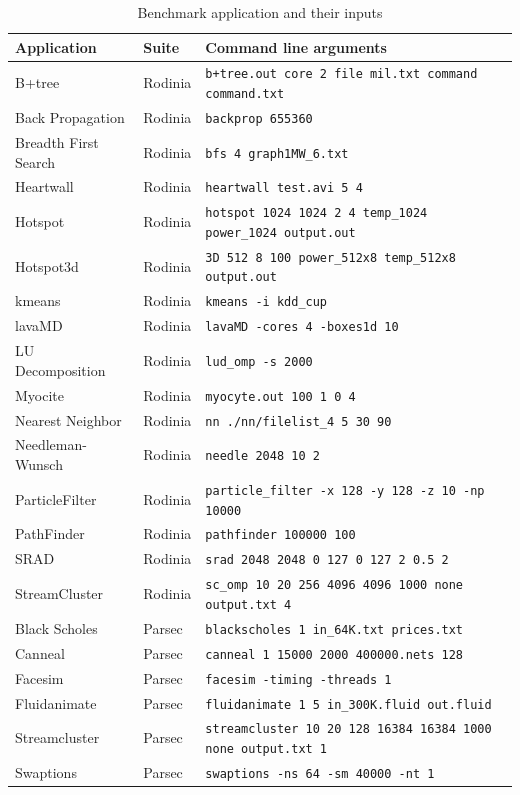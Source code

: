 \documentclass[12pt,twoside]{reedthesis}
\begin{document}
		
		\begin{table}
			\caption{Benchmark application and their inputs}
			\label{all-applications-table}
			\scriptsize
			\begin{tabular}{ |l|l|l| }
				\hline
				Application          & Suite   & Command line arguments  \\ \hline
				\hline
				B+tree & Rodinia  &  \texttt{b+tree.out core 2 file mil.txt command command.txt}  \\ \hline
				Back Propagation & Rodinia  &  \texttt{backprop 655360} \\ \hline
				Breadth First Search & Rodinia  &  \texttt{bfs 4 graph1MW\_6.txt}  \\ \hline
				Heartwall & Rodinia  & \texttt{heartwall test.avi 5 4} \\ \hline
				Hotspot & Rodinia  &   \texttt{hotspot 1024 1024 2 4 temp\_1024 power\_1024 output.out} \\ \hline
				Hotspot3d & Rodinia  & \texttt{3D 512 8 100 power\_512x8 temp\_512x8 output.out}   \\ \hline
				kmeans & Rodinia  &    \texttt{kmeans -i kdd\_cup} \\ \hline
				lavaMD & Rodinia  &  \texttt{lavaMD -cores 4 -boxes1d 10}   \\ \hline
				LU Decomposition & Rodinia    &  \texttt{lud\_omp -s 2000} \\ \hline
				Myocite & Rodinia  &  \texttt{myocyte.out 100 1 0 4}  \\ \hline
				Nearest Neighbor & Rodinia  &  \texttt{nn ./nn/filelist\_4 5 30 90}   \\ \hline
				Needleman-Wunsch & Rodinia  & \texttt{needle 2048 10 2}    \\ \hline
				ParticleFilter & Rodinia  &    \texttt{particle\_filter -x 128 -y 128 -z 10 -np 10000} \\ \hline
				PathFinder & Rodinia  &  \texttt{pathfinder 100000 100}   \\ \hline
				SRAD & Rodinia  &  \texttt{srad 2048 2048 0 127 0 127 2 0.5 2}   \\ \hline
				StreamCluster & Rodinia  &    \texttt{sc\_omp 10 20 256 4096 4096 1000 none output.txt 4} \\ \hline
				Black Scholes & Parsec  &  \texttt{blackscholes 1 in\_64K.txt prices.txt} \\ \hline
				Canneal & Parsec  &  \texttt{canneal 1 15000 2000 400000.nets 128} \\ \hline
				Facesim & Parsec  &  \texttt{facesim -timing -threads 1} \\ \hline
				Fluidanimate & Parsec  &  \texttt{fluidanimate 1 5 in\_300K.fluid out.fluid} \\ \hline
				Streamcluster & Parsec  &  \texttt{streamcluster 10 20 128 16384 16384 1000 none output.txt 1} \\ \hline
				Swaptions & Parsec  &  \texttt{swaptions -ns 64 -sm 40000 -nt 1} \\ \hline
			\end{tabular}
		\end{table}
		
\end{document}
